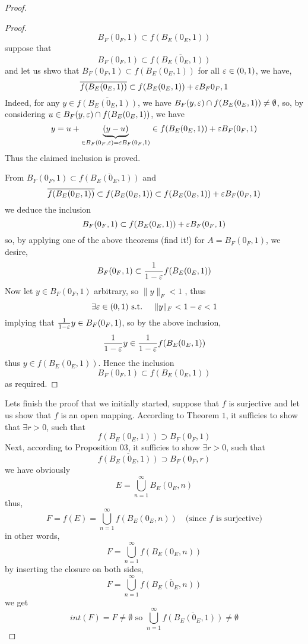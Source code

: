 \begin{proof}
\begin{proof}
\[B_{F}(0_{F} ,1)  \subset f(B_{E}(0_{E},1) ) 
\]
suppose that 
\[
B_{F}(0_{F} ,1)  \subset 
\overline{f(B_{E}(0_{E},1) ) } 
\]
and let us shwo that $B_{F}(0_{F}, 1) \subset f(B_{E}(0_{E},1) ) $   
for all $\varepsilon  \in  (0,1)$, we have,
\[
\overline{f(B_{E}(0_{E},1) ) } \subset 
f(B_{E} (0_{E},1) )  + \varepsilon  
B_{F}{0_{F},1}
\]
Indeed, for any  $y \in  \overline{f(B_{E}(0_{E},1) ) } $, 
we have $B_{F}(y, \varepsilon ) \cap f(B_{E}(0_{E},1) ) \neq  \emptyset    $, 
so, by considering $u \in  B_{F}(y, \varepsilon ) \cap 
f(B_{E}(0_{E},1) ) $, we have 
\[
y = u + 
\underbrace{
(y-u) 
}_{\in  B_{F}(0_{F},\varepsilon ) = \varepsilon B_{F}(0_{F},1)  }   
\in  f(B_{E}(0_{E},1)) + \varepsilon  B_{F}(0_{F},1)  
\]
Thus the claimed inclusion is proved.


From $B_{F}(0_{F},1)  \subset  \overline{f(B_{E}(0_{E},1) ) }$  
and 
\[
\overline{f(B_{E}(0_{E},1) ) } \subset 
f(B_{E}(0_{E},1)) \subset f(B_{E}(0_{E},1) ) + 
\varepsilon B_{F }(0_{F},1) 
\]
we deduce the inclusion 
\[
B_{F}(0_{F},1)  \subset 
f(B_{E}(0_{E},1) )  + \varepsilon  B_{F}(0_{F}, 1) 
\]
so, by applying  one of the above theorems (find it!) for 
$A = B_{F}(0_{F} , 1)  $, we desire,
\[
B_{F}(0_{F}, 1)  \subset 
\frac{1}{1-\varepsilon } f(B_E(0_{E},1) )  
\]
Now let $y \in  B_{F}(0_{F},1)  $ arbitrary, so 
$\| y \| _{F} <  1 $ , thus 
\[
\exists  \varepsilon  \in  (0,1)  \text{ s.t. }  \quad 
\| y \| _{F} <  1 - \varepsilon <  1
\]
implying that 
$\frac{1}{1 - \varepsilon } y \in  B_{F}(0_{F},1) $, so by the above inclusion, 
\[
\frac{1}{1-\varepsilon } y \in   
\frac{1}{1- \varepsilon } f(B_{E}(0_{E},1) ) 
\]
thus $y \in  f(B_{E}(0_{E},1) )  $. Hence the inclusion 
\[
	B_{F}(0_{F},1)  \subset 
	f(B_{E}(0_{E},1))  
\]
as required.
\end{proof}
\divider
Lets finish the proof that we initially started, 
suppose that $f $ is surjective and let us show 
that $f $ is an open mapping. According to Theorem $1 $, it sufficies 
to show that $\exists  r > 0 $, such that 
\[  
	f(B_{E}(0_{E},1) )  \supset 
	B_{F}(0_{F},1) 
\]
Next, according to Proposition 03, it sufficies 
to show $\exists  r > 0 $, such that 
\[
	\overline{f(B_{E}(0_{E},1) ) } 
	\supset B_{F}(0_{F},r) 
\]
we have obviously 
\[
E = \bigcup_{n=1}^{\infty } B_{E}(0_{E}, n) 
\]
thus, 
\[
F = f(E) = \bigcup_{n=1}^{\infty }   
f(B_{E}(0_{E},n) )  
\quad 
\text{
	(since $f $ is surjective)
} 
\]
in other words, 
\[
F = \bigcup_{n=1}^{\infty } f(B_{E}(0_{E},n) ) 
\]
by inserting the closure on both sides, 
\[
F = \bigcup_{n=1}^{\infty } 
\overline{f(B_{E}(0_{E},n) ) } 
\]
we get 
\[
	int(F)  = F \neq \emptyset  \text{ so }  
	\bigcup_{n=1}^{\infty }  
	\overline{f(B_{E}(0_{E},1) ) } \neq  \emptyset 
\]
\end{proof}
